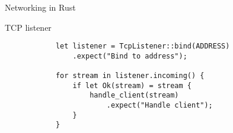 \begin{frame}[fragile]{Networking in Rust}

    \begin{block}{TCP listener}
        \begin{verbatim}
            let listener = TcpListener::bind(ADDRESS)
                .expect("Bind to address");
            
            for stream in listener.incoming() {
                if let Ok(stream) = stream {
                    handle_client(stream)
                        .expect("Handle client");
                }
            }
        \end{verbatim}
    \end{block}
\end{frame}
